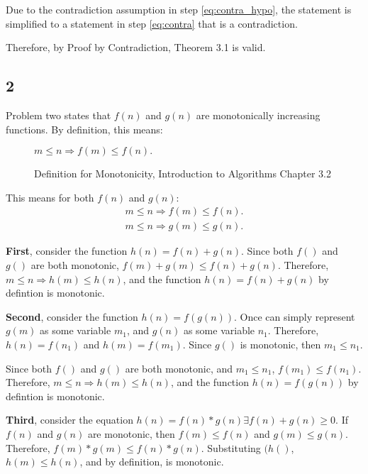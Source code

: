 \documentclass[11pt,letterpaper]{article}
\begin{document}
Due to the contradiction assumption in step \ref{eq:contra_hypo}, the statement is simplified to a statement
in step \ref{eq:contra} that is a contradiction. 

Therefore, by Proof by Contradiction, Theorem 3.1 is valid.


\subsection*{2}
Problem two states that $f(n)$ and $g(n)$ are monotonically increasing functions. By definition, this means:

\begin{figure}[!h]

	\begin{center}
	$ m \leq n \Rightarrow f(m) \leq f(n). $
	\end{center}

\caption{Definition for Monotonicity, Introduction to Algorithms Chapter 3.2}
\label{monotonicity}
\end{figure}

This means for both $f(n)$ and $g(n)$:
\begin{eqnarray}
	m \leq n \Rightarrow f(m) \leq f(n). \\
	m \leq n \Rightarrow g(m) \leq g(n).
\end{eqnarray}

\textbf{First}, consider the function $h(n) = f(n) + g(n)$. Since both $f()$ and $g()$ are both monotonic, 
$f(m) + g(m) \leq f(n) + g(n). $ Therefore, $m \leq n \Rightarrow h(m) \leq h(n) $, and the function
$h(n) = f(n) + g(n)$ by defintion is monotonic.

\textbf{Second}, consider the function $h(n) = f(g(n))$. Once can simply represent $g(m)$ as some
variable $m_1$, and $g(n)$ as some variable $n_1$. Therefore, $h(n) = f(n_1)$ and $h(m) = f(m_1)$.
Since $g()$ is monotonic, then $m_1 \leq n_1$. 

Since both $f()$ and $g()$ are both monotonic, and $m_1 \leq n_1 $, 
$f(m_1) \leq f(n_1). $ Therefore, $m \leq n \Rightarrow h(m) \leq h(n) $, and the function
$h(n) = f(g(n))$ by defintion is monotonic.

\textbf{Third}, consider the equation $h(n) = f(n) * g(n) \exists f(n) + g(n) \geq 0 $. If $f(n)$ and $g(n)$ are
monotonic, then $f(m) \leq f(n)$ and $g(m) \leq  g(n)$. Therefore, $f(m) * g(m) \leq f(n) * g(n)$. Substituting 
$(h()$, $h(m) \leq h(n)$, and by definition, is monotonic.
\end{document}
